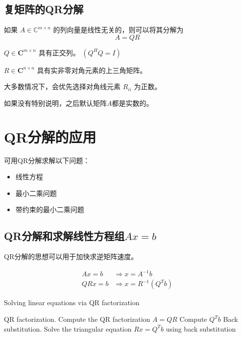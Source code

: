 
\subsection{复矩阵的QR分解}

\begin{theorem}
    如果 $A \in \mathbb{C}^{m \times n}$ 的列向量是线性无关的，则可以将其分解为
\begin{equation}
A=Q R
\end{equation}

$Q \in \boldsymbol{C}^{m \times n}$ 具有正交列。 $\left(Q^{H} Q=I\right)$

$R \in \boldsymbol{C}^{n \times n}$ 具有实非零对角元素的上三角矩阵。
\end{theorem}

大多数情况下，会优先选择对角线元素 $R_{i i}$ 为正数。

如果没有特别说明，之后默认矩阵$A$都是实数的。

\section{QR分解的应用}

可用QR分解求解以下问题：

\begin{itemize}
    \item 线性方程
    \item 最小二乘问题
    \item 带约束的最小二乘问题
\end{itemize}

\subsection{QR分解和求解线性方程组$Ax = b$}

QR分解的思想可以用于加快求逆矩阵速度。

\begin{corollary}
\begin{equation}\begin{aligned}
   Ax = b &\Rightarrow x = A^{-1} b \\
QRx = b &\Rightarrow x = R^{-1} \left(Q^Tb\right)
\end{aligned}
\end{equation}
\end{corollary}

\begin{algorithm}[htbp]
    \caption{Solving linear equations via QR factorization}
    
    QR factorization. Compute the QR factorization $ A=Q R $\;
    Compute $ Q^{T} b $\;
    Back substitution. Solve the triangular equation $ R x=Q^{T} b $ using back substitution\;
\end{algorithm}

